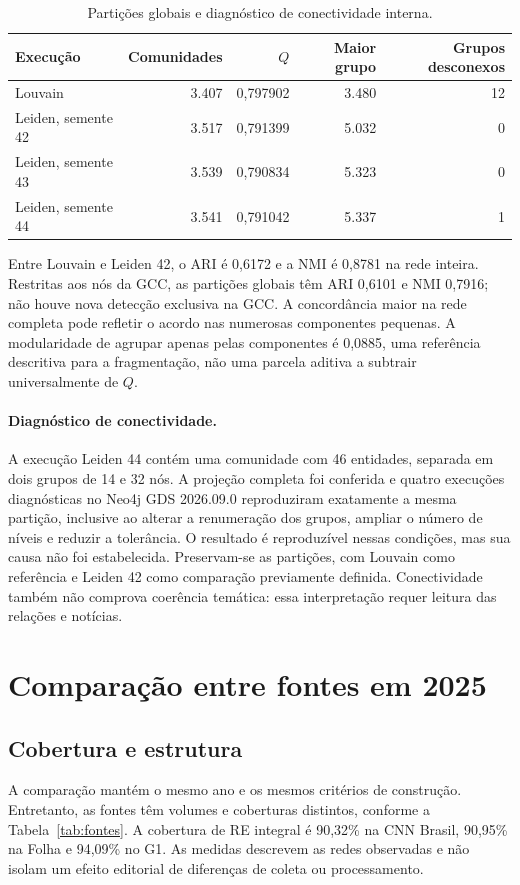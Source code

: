 \documentclass[11pt,a4paper]{article}
\begin{document}
\begin{table}[H]\centering\small
\caption{Partições globais e diagnóstico de conectividade interna.}\label{tab:comunidades}
\begin{tabular}{lrrrr}\toprule
Execução & Comunidades & $Q$ & Maior grupo & Grupos desconexos\\\midrule
Louvain & 3.407 & 0,797902 & 3.480 & 12\\
Leiden, semente 42 & 3.517 & 0,791399 & 5.032 & 0\\
Leiden, semente 43 & 3.539 & 0,790834 & 5.323 & 0\\
Leiden, semente 44 & 3.541 & 0,791042 & 5.337 & 1\\\bottomrule
\end{tabular}
\end{table}

Entre Louvain e Leiden 42, o ARI é 0,6172 e a NMI é 0,8781 na rede inteira. Restritas aos nós da GCC, as partições globais têm ARI 0,6101 e NMI 0,7916; não houve nova detecção exclusiva na GCC. A concordância maior na rede completa pode refletir o acordo nas numerosas componentes pequenas. A modularidade de agrupar apenas pelas componentes é 0,0885, uma referência descritiva para a fragmentação, não uma parcela aditiva a subtrair universalmente de $Q$.

\paragraph{Diagnóstico de conectividade.} A execução Leiden 44 contém uma comunidade com 46 entidades, separada em dois grupos de 14 e 32 nós. A projeção completa foi conferida e quatro execuções diagnósticas no Neo4j GDS 2026.09.0 reproduziram exatamente a mesma partição, inclusive ao alterar a renumeração dos grupos, ampliar o número de níveis e reduzir a tolerância. O resultado é reproduzível nessas condições, mas sua causa não foi estabelecida. Preservam-se as partições, com Louvain como referência e Leiden 42 como comparação previamente definida. Conectividade também não comprova coerência temática: essa interpretação requer leitura das relações e notícias.

\clearpage
\section{Comparação entre fontes em 2025}
\subsection{Cobertura e estrutura}
A comparação mantém o mesmo ano e os mesmos critérios de construção. Entretanto, as fontes têm volumes e coberturas distintos, conforme a Tabela~\ref{tab:fontes}. A cobertura de RE integral é 90,32\% na CNN Brasil, 90,95\% na Folha e 94,09\% no G1. As medidas descrevem as redes observadas e não isolam um efeito editorial de diferenças de coleta ou processamento.
\end{document}
